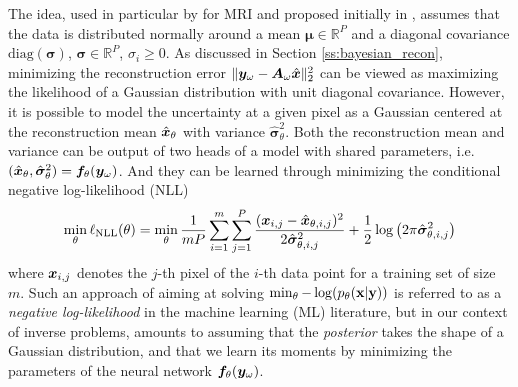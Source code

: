 The idea, used in particular by \citet{zhang2019reducing} for MRI and proposed initially in \citet{kendall2017uncertainties}, assumes that the data is distributed normally around a mean $\boldsymbol{\mu}\in \mathbb{R}^P$ and a diagonal covariance $\text{diag}(\boldsymbol{\sigma})$, $\boldsymbol{\sigma} \in \mathbb{R}^P$, $\sigma_i \geq 0$. As discussed in Section \ref{ss:bayesian_recon}, minimizing the reconstruction error $\|{\bm{y}}_\omega-{\bm{A}}_\omega \hat{{\bm{x}}}\|_2^2$ can be viewed as maximizing the likelihood of a Gaussian distribution with unit diagonal covariance. However, it is possible to model the uncertainty at a given pixel as a Gaussian centered at the reconstruction mean $\hat{{\bm{x}}}_\theta$ with variance $\hat{\boldsymbol{\sigma}}^2_\theta$. Both the reconstruction mean and variance can be output of two heads of a model with shared parameters, i.e. $(\hat{{\bm{x}}}_\theta, \hat{\boldsymbol{\sigma}}_\theta^2) = {\bm{f}}_\theta({\bm{y}}_\omega)$. And they can be learned through minimizing the conditional negative log-likelihood (NLL) 
\begin{equation}
    \min_\theta \ell_{\text{NLL}}(\theta) = \min_\theta \frac{1}{mP} \sum_{i=1}^m \sum_{j=1}^P \frac{({\bm{x}}_{i,j} - \hat{{\bm{x}}}_{\theta,i,j})^2}{2\hat{\boldsymbol{\sigma}}_{\theta,i,j}^2} + \frac{1}{2} \log\left(2\pi\hat{\boldsymbol{\sigma}}_{\theta,i,j}^2\right)\label{eq:zhang_objective}
\end{equation}
where ${\bm{x}}_{i,j}$ denotes the $j$-th pixel of the $i$-th data point for a training set of size $m$. Such an approach of aiming at solving $\min_\theta -\log(p_\theta({\mathbf{x}}|{\mathbf{y}}))$ is referred to as a \textit{negative log-likelihood} in the machine learning (ML) literature, but in our context of inverse problems,  amounts to assuming that the \textit{posterior} takes the shape of a Gaussian distribution, and that we learn its moments by minimizing the parameters of the neural network ${\bm{f}}_\theta({\bm{y}}_\omega)$.

